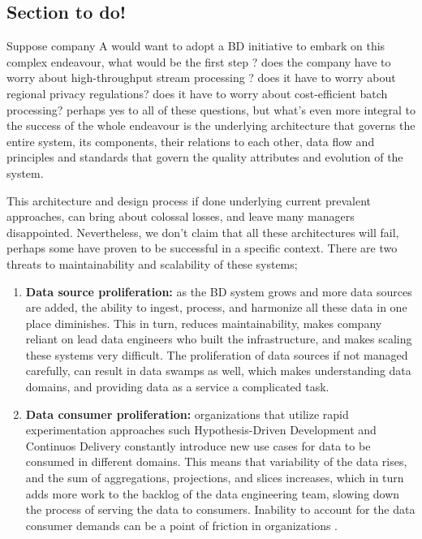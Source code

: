 \documentclass[review]{elsarticle}
\begin{document}
\subsection{Section to do!}



Suppose company A would want to adopt a BD initiative to embark on this complex endeavour, what would be the first step ? does the company have to worry about high-throughput stream processing ? does it have to worry about regional privacy regulations? does it have to worry about cost-efficient batch processing? perhaps yes to all of these questions, but what's even more integral to the success of the whole endeavour is the underlying architecture that governs the entire system, its components, their relations to each other, data flow and principles and standards that govern the quality attributes and evolution of the system.

This architecture and design process if done underlying current prevalent approaches, can bring about colossal losses, and leave many managers disappointed. Nevertheless, we don't claim that all these architectures will fail, perhaps some have proven to be successful in a specific context. There are two threats to maintainability and scalability of these systems;

\begin{enumerate}
    \item \textbf{Data source proliferation:} as the BD system grows and more data sources are added, the ability to ingest, process, and harmonize all these data in one place diminishes. This in turn, reduces maintainability, makes company reliant on lead data engineers who built the infrastructure, and makes scaling these systems very difficult. The proliferation of data sources if not managed carefully, can result in data swamps as well, which makes understanding data domains, and providing data as a service a complicated task.
    \item \textbf{Data consumer proliferation:} organizations that utilize rapid experimentation approaches such Hypothesis-Driven Development and Continuos Delivery \cite{hypothesisDev} constantly introduce new use cases for data to be consumed in different domains. This means that variability of the data rises, and the sum of aggregations, projections, and slices increases, which in turn adds more work to the backlog of the data engineering team, slowing down the process of serving the data to consumers. Inability to account for the data consumer demands can be a point of friction in organizations \cite{monolithToMesh}.
\end{enumerate}
\end{document}
